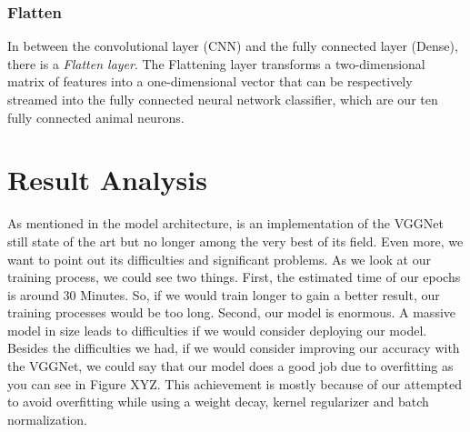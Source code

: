 \documentclass[journal]{IEEEtran}
\begin{document}
\subsubsection{Flatten}
In between the convolutional layer (CNN) and the fully connected layer (Dense), there is a \textit{Flatten layer}. The Flattening layer transforms a two-dimensional matrix of features into a one-dimensional vector that can be respectively streamed into the fully connected neural network classifier, which are our ten fully connected animal neurons. \\
%
%
\section{Result Analysis}
As mentioned in the model architecture, is an implementation of the VGGNet still state of the art but no longer among the very best of its field. Even more, we want to point out its difficulties and significant problems. As we look at our training process, we could see two things. First, the estimated time of our epochs is around 30 Minutes. So, if we would train longer to gain a better result, our training processes would be too long. Second, our model is enormous.  A massive model in size leads to difficulties if we would consider deploying our model.\\
Besides the difficulties we had, if we would consider improving our accuracy with the VGGNet, we could say that our model does a good job due to overfitting as you can see in Figure XYZ. This achievement is mostly because of our attempted to avoid overfitting while using a weight decay, kernel regularizer and batch normalization. 

\ifCLASSOPTIONcaptionsoff
  \newpage
\fi


\vfill
\end{document}
